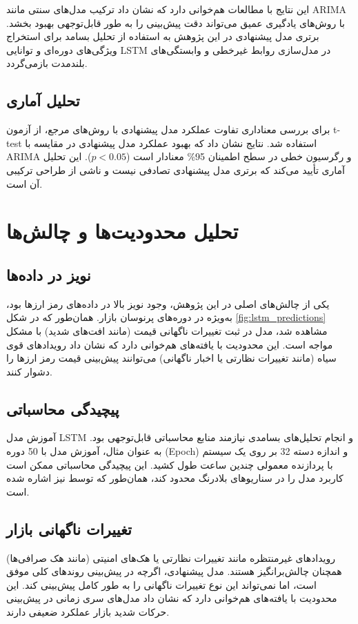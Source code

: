 این نتایج با مطالعات \cite{zhang2005forecasting} هم‌خوانی دارد که نشان داد ترکیب مدل‌های سنتی مانند ARIMA با روش‌های یادگیری عمیق می‌تواند دقت پیش‌بینی را به طور قابل‌توجهی بهبود بخشد. برتری مدل پیشنهادی در این پژوهش به استفاده از تحلیل بسامد برای استخراج ویژگی‌های دوره‌ای و توانایی LSTM در مدل‌سازی روابط غیرخطی و وابستگی‌های بلندمدت بازمی‌گردد.



\subsection{تحلیل آماری}
برای بررسی معناداری تفاوت عملکرد مدل پیشنهادی با روش‌های مرجع، از آزمون t-test استفاده شد. نتایج نشان داد که بهبود عملکرد مدل پیشنهادی در مقایسه با ARIMA و رگرسیون خطی در سطح اطمینان 95\% معنادار است (\(p < 0.05\)). این تحلیل آماری تأیید می‌کند که برتری مدل پیشنهادی تصادفی نیست و ناشی از طراحی ترکیبی آن است.

\section{تحلیل محدودیت‌ها و چالش‌ها}
\label{sec:limitationsd}

\subsection{نویز در داده‌ها}
یکی از چالش‌های اصلی در این پژوهش، وجود نویز بالا در داده‌های رمز ارزها بود، به‌ویژه در دوره‌های پرنوسان بازار. همان‌طور که در شکل \ref{fig:lstm_predictions} مشاهده شد، مدل در ثبت تغییرات ناگهانی قیمت (مانند افت‌های شدید) با مشکل مواجه است. این محدودیت با یافته‌های \cite{fry2018market} هم‌خوانی دارد که نشان داد رویدادهای قوی سیاه (مانند تغییرات نظارتی یا اخبار ناگهانی) می‌توانند پیش‌بینی قیمت رمز ارزها را دشوار کنند.

\subsection{پیچیدگی محاسباتی}
آموزش مدل LSTM و انجام تحلیل‌های بسامدی نیازمند منابع محاسباتی قابل‌توجهی بود. به عنوان مثال، آموزش مدل با 50 دوره (Epoch) و اندازه دسته 32 بر روی یک سیستم با پردازنده معمولی چندین ساعت طول کشید. این پیچیدگی محاسباتی ممکن است کاربرد مدل را در سناریوهای بلادرنگ محدود کند، همان‌طور که توسط \cite{author1} نیز اشاره شده است.

\subsection{تغییرات ناگهانی بازار}
رویدادهای غیرمنتظره مانند تغییرات نظارتی یا هک‌های امنیتی (مانند هک صرافی‌ها) همچنان چالش‌برانگیز هستند. مدل پیشنهادی، اگرچه در پیش‌بینی روندهای کلی موفق است، اما نمی‌تواند این نوع تغییرات ناگهانی را به طور کامل پیش‌بینی کند. این محدودیت با یافته‌های \cite{lo1997market} هم‌خوانی دارد که نشان داد مدل‌های سری زمانی در پیش‌بینی حرکات شدید بازار عملکرد ضعیفی دارند.




